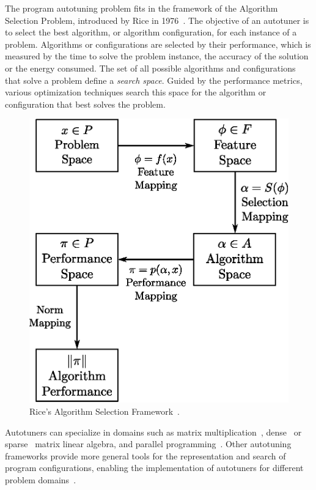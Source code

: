 \documentclass[a4paper, 12pt]{article}
\begin{document}
The program autotuning problem fits in the framework of the Algorithm Selection
Problem, introduced by Rice in 1976~\cite{rice1976algorithm}. The objective of
an autotuner is to select the best algorithm, or algorithm configuration, for
each instance of a problem.  Algorithms or configurations are selected by their
performance, which is measured by the time to solve the problem instance, the
accuracy of the solution or the energy consumed.  The set of all possible
algorithms and configurations that solve a problem define a \emph{search
space}. Guided by the performance metrics, various optimization techniques
search this space for the algorithm or configuration that best solves the
problem.

\begin{figure}[htpb]
    \centering
    \includegraphics[scale=.5]{algorithm-selection}
    \caption{Rice's Algorithm Selection Framework~\cite{rice1976algorithm}.}
    \label{fig:asf}
\end{figure}

Autotuners can specialize in domains such as matrix
multiplication~\cite{bilmes1997phipac}, dense~\cite{whaley1998atlas} or
sparse~\cite{vuduc2005oski} matrix linear algebra, and parallel
programming~\cite{jordan2012multi}. Other autotuning frameworks provide more
general tools for the representation and search of program configurations,
enabling the implementation of autotuners for different problem
domains~\cite{ansel2014opentuner,hutter2009paramils}.
\end{document}
